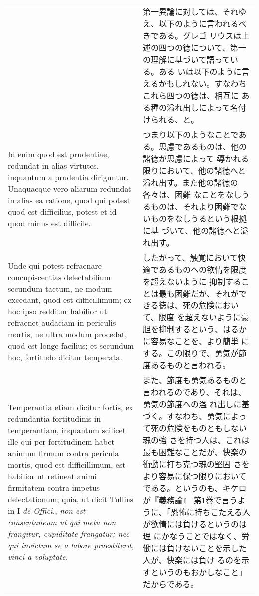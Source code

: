 \documentclass[10pt]{jsarticle}
\begin{document}
\begin{longtable}{p{21em}p{21em}}
&

 第一異論に対しては、それゆえ、以下のように言われるべきである。グレゴ
 リウスは上述の四つの徳について、第一の理解に基づいて語っている。ある
 いは以下のように言えるかもしれない。すなわちこれら四つの徳は、相互に
 ある種の溢れ出しによって名付けられる、と。

 
\\

 Id enim quod est prudentiae, redundat in alias virtutes, inquantum a
prudentia diriguntur. Unaquaeque vero aliarum redundat in alias ea
ratione, quod qui potest quod est difficilius, potest et id quod minus
est difficile.


&

つまり以下のようなことである。思慮であるものは、他の諸徳が思慮によって
導かれる限りにおいて、他の諸徳へと溢れ出す。また他の諸徳の各々は、困難
なことをなしうるものは、それより困難でないものをなしうるという根拠に基
づいて、他の諸徳へと溢れ出す。
 
 
\\



 Unde qui potest refraenare
concupiscentias delectabilium secundum tactum, ne modum excedant, quod
est difficillimum; ex hoc ipso redditur habilior ut refraenet audaciam
in periculis mortis, ne ultra modum procedat, quod est longe facilius;
 et secundum hoc, fortitudo dicitur temperata.


&

 したがって、触覚において快適であるものへの欲情を限度を超えないように
 抑制することは最も困難だが、それができる徳は、死の危険において、限度
 を超えないように豪胆を抑制するという、はるかに容易なことを、より簡単
 にする。この限りで、勇気が節度あるものと言われる。
 
\\

 Temperantia etiam dicitur fortis, ex redundantia fortitudinis in
temperantiam, inquantum scilicet ille qui per fortitudinem habet
animum firmum contra pericula mortis, quod est difficillimum, est
habilior ut retineat animi firmitatem contra impetus delectationum;
quia, ut dicit Tullius in I {\itshape de Offici}., {\itshape non est
consentaneum ut qui metu non frangitur, cupiditate frangatur; nec qui
invictum se a labore praestiterit, vinci a voluptate}.


&

 また、節度も勇気あるものと言われるのであり、それは、勇気の節度への溢
 れ出しに基づく。すなわち、勇気によって死の危険をものともしない魂の強
 さを持つ人は、これは最も困難なことだが、快楽の衝動に打ち克つ魂の堅固
 さをより容易に保つ限りにおいてである。というのも、キケロが『義務論』
 第1巻で言うように、「恐怖に持ちこたえる人が欲情には負けるというのは理
 にかなうことではなく、労働には負けないことを示した人が、快楽には負け
 るのを示すというのもおかしなこと」だからである。


\end{longtable}
\end{document}
